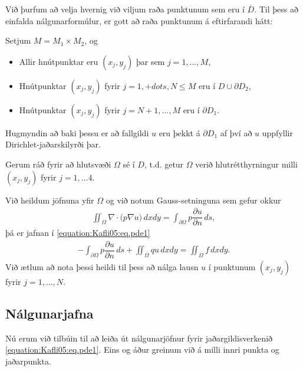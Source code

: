 \documentclass[a4paper,10pt,icelandic]{sphinxmanual}
\begin{document}
Við þurfum að velja hvernig við viljum raða punktunum sem eru í \(\overline D\). Til þess að einfalda nálgunarformúlur, er gott að raða punktunum á eftirfarandi hátt:

Setjum \(M = M_1 \times M_2\), og
\begin{itemize}
\item {} 
Allir hnútpunktar eru \((x_j, y_j)\) þar sem \(j=1, \dots, M\),

\item {} 
Hnútpunktar \((x_j, y_j)\) fyrir  \(j=1,+dots, N\leq M\) eru í  \(D\cup \partial D_2\),

\item {} 
Hnútpunktar \((x_j, y_j)\) fyrir \(j=N+1, \dots, M\) eru í  \(\partial D_1\).

\end{itemize}

Hugmyndin að baki þessu er að fallgildi  \(u\) eru þekkt á \(\partial D_1\) af því að \(u\) uppfyllir Dirichlet-jaðarskilyrði þar.


Gerum ráð fyrir að hlutsvæði \(\Omega\) sé í \(D\), t.d. getur \(\Omega\) verið hlutrétthyrningur milli \((x_j,y_j)\) fyrir \(j=1, \dots 4\).

Við heildum jöfnuna yfir \(\Omega\) og við notum Gauss-setninguna sem gefur okkur
\begin{equation*}
\begin{split}\iint_\Omega \nabla\cdot\big(p\nabla u\big) \, dxdy
=\int_{\partial\Omega} p\dfrac{\partial u}{\partial n}\, ds,\end{split}
\end{equation*}
þá er jafnan í \eqref{equation:Kafli05:eq.pde1}
\begin{equation*}
\begin{split}-\int_{\partial\Omega } p\dfrac{\partial u}{\partial n}\, ds
+\iint_\Omega qu\, dxdy =\iint_\Omega f\, dxdy.\end{split}
\end{equation*}
Við ætlum að nota þessi heildi til þess að nálga lausn \(u\) í punktunum \((x_j, y_j)\) fyrir  \(j=1,\dots, N\).


\subsection{Nálgunarjafna}
\label{\detokenize{Kafli05:nalgunarjafna}}
Nú erum við tilbúin til að leiða út nálgunarjöfnur fyrir jaðargildisverkenið \eqref{equation:Kafli05:eq.pde1}. Eins og áður greinum við á milli innri punkta og jaðarpunkta.
\end{document}

